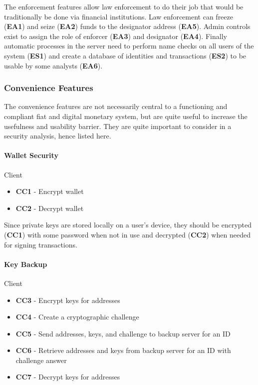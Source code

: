 \documentclass[a4paper,12pt]{article} %
\begin{document}
{{The enforcement features allow law enforcement to do their job that would be traditionally be done via financial institutions. Law enforcement can freeze (\textbf{EA1}) and seize (\textbf{EA2}) funds to the designator address (\textbf{EA5}). Admin controls exist to assign the role of enforcer (\textbf{EA3}) and designator (\textbf{EA4}). Finally automatic processes in the server need to perform name checks on all users of the system (\textbf{ES1}) and create a database of identities and transactions (\textbf{ES2}) to be usable by some analysts (\textbf{EA6}).

\subsubsection{Convenience Features} \label{sssec:3.3:backup}

The convenience features are not necessarily central to a functioning and compliant fiat and digital monetary system, but are quite useful to increase the usefulness and usability barrier. They are quite important to consider in a security analysis, hence listed here.

\paragraph*{Wallet Security}
Client
\begin{itemize}
	\item \textbf{CC1} - Encrypt wallet
	\item \textbf{CC2} - Decrypt wallet
\end{itemize}

Since private keys are stored locally on a user's device, they should be encrypted (\textbf{CC1}) with some password when not in use and decrypted (\textbf{CC2}) when needed for signing transactions.

\paragraph*{Key Backup}

Client
\begin{itemize}
	\item \textbf{CC3} - Encrypt keys for addresses
	\item \textbf{CC4} - Create a cryptographic challenge
	\item \textbf{CC5} - Send addresses, keys, and challenge to backup server for an ID
	\item \textbf{CC6} - Retrieve addresses and keys from backup server for an ID with challenge answer
	\item \textbf{CC7} - Decrypt keys for addresses
\end{itemize}

}}
\end{document}
